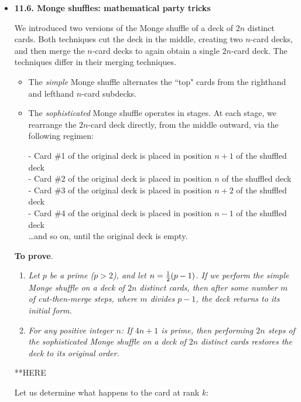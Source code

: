 \begin{itemize}


\medskip\item
{\bf 11.6. Monge shuffles: mathematical party tricks}

\smallskip

We introduced two versions of the Monge shuffle of a deck of $2n$ distinct cards.  Both techniques cut the deck in the middle, creating two $n$-card decks, and then merge the $n$-card decks to again obtain a single $2n$-card deck.  The techniques differ in their merging techniques.
  \begin{itemize}
  \item 
The {\em simple} Monge shuffle alternates the ``top" cards from the righthand and lefthand $n$-card subdecks. 

  \medskip\item
The {\em sophisticated} Monge shuffle operates in stages.  At each stage, we rearrange the $2n$-card deck directly, from the middle outward, via the following regimen:
\smallskip

\noindent
- Card \#1 of the original deck is placed in position $n+1$ of the shuffled deck \\
- Card \#2 of the original deck is placed in position $n$ of the shuffled deck \\
- Card \#3 of the original deck is placed in position $n+2$ of the shuffled deck \\
- Card \#4 of the original deck is placed in position $n-1$ of the shuffled deck \\
\hspace*{.1in} \ldots and so on, until the original deck is empty.
  \end{itemize}

{\bf To prove}.
\begin{enumerate}
\item
{\em Let $p$ be a prime ($p>2$), and let $n = {1 \over 2} (p-1)$.  If we perform the simple Monge shuffle on a deck of $2n$ distinct cards, then after some number $m$ of cut-then-merge steps, where $m$ divides $p-1$, the deck returns to its initial form.}

\medskip\item
{\em For any positive integer $n$:  If $4n+1$ is prime, then performing $2n$ steps of the sophisticated Monge shuffle on a deck of $2n$ distinct cards restores the deck to its original order.}
\end{enumerate}

**HERE

Let us determine what happens to the card at rank $k$:


\end{itemize}
